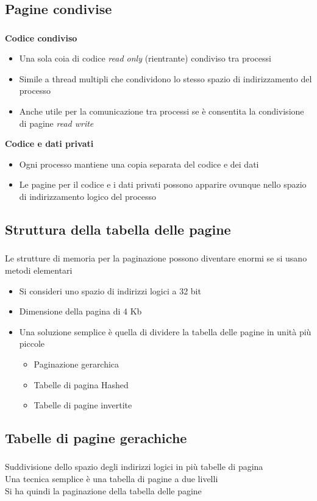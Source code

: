 \documentclass{beamer}
\newenvironment{mainframe}{
	\begin{frame}
		\frametitle{\insertsubsection}
		\framesubtitle{\insertsection}
	}{
	\end{frame}
}
\begin{document}
\subsection{Pagine condivise}
\begin{mainframe}
	\textbf{Codice condiviso}
	\begin{itemize}
		\item Una sola coia di codice \textit{read only} (rientrante) condiviso tra processi
		\item Simile a thread multipli che condividono lo stesso spazio di indirizzamento del processo
		\item Anche utile per la comunicazione tra processi se è consentita la condivisione di pagine \textit{read write}
	\end{itemize}
	\textbf{Codice e dati privati}
	\begin{itemize}
		\item Ogni processo mantiene una copia separata del codice e dei dati
		\item  Le pagine per il codice e i dati privati possono apparire ovunque nello spazio di indirizzamento logico del processo
	\end{itemize}
\end{mainframe}
\subsection{Struttura della tabella delle pagine}
\begin{mainframe}
	Le strutture di memoria per la paginazione possono diventare enormi se si usano metodi elementari
	\begin{itemize}
		\item Si consideri uno spazio di indirizzi logici a 32 bit
		\item Dimensione della pagina di 4 Kb
		\item Una soluzione semplice è quella di dividere la tabella delle pagine in unità più piccole
		\begin{itemize}
			\item Paginazione gerarchica
			\item Tabelle di pagina Hashed
			\item Tabelle di pagine invertite
		\end{itemize}
	\end{itemize}
\end{mainframe}
\subsection{Tabelle di pagine gerachiche}
\begin{mainframe}
	Suddivisione dello spazio degli indirizzi logici in più tabelle di pagina\\
	Una tecnica semplice è una tabella di pagine a due livelli\\
	Si ha quindi la paginazione della tabella delle pagine
\end{mainframe}
\end{document}
